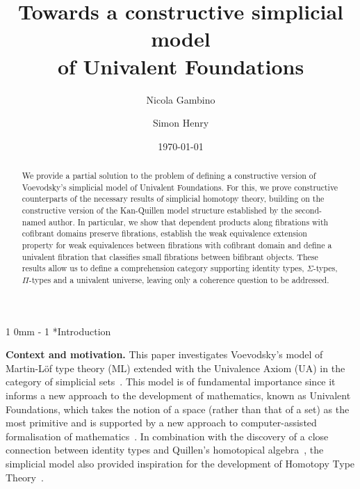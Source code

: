 \documentclass[reqno,10pt,a4paper,oneside]{amsart}
\title[]{Towards a constructive  simplicial model \\ of Univalent Foundations}
\makeatletter
\renewcommand{\section}{\@startsection
{section}%
{1}%
{0mm}%
{-\baselineskip}%
{1\baselineskip}%
{\Large \bfseries}}%
\numberwithin{equation}{section}
\theoremstyle{mythm}
\theoremstyle{mydef}
\theoremstyle{myrmk}
\makeatother
\begin{document}
\begin{abstract}
We provide a partial solution to the problem of defining a constructive version of 
Voevodsky's simplicial model of Univalent Foundations. For this, we prove constructive counterparts of the 
necessary results of simplicial homotopy theory, building on the constructive
version of the Kan-Quillen model structure established by the second-named author. In particular, 
 we show  that dependent products along fibrations with
 cofibrant domains preserve fibrations, establish the weak equivalence extension property
for weak equivalences between fibrations with cofibrant domain and define a univalent 
fibration that classifies small fibrations between bifibrant objects. 
These results allow us to define a comprehension category supporting identity types,
$\Sigma$-types, $\Pi$-types and a univalent universe, leaving only
a coherence question to be addressed.
\end{abstract}

\author{Nicola Gambino}
\address{School of Mathematics, University of Leeds, United Kingdom}


\author{Simon Henry}
\address{Department of Mathematics and Statistics, University of Ottawa, Canads}


 \date{\today}
 
 

\maketitle

\tableofcontents

\section*{Introduction} 

\textbf{Context and motivation.} This paper investigates Voevodsky's model of Martin-L\"of type theory (ML)
extended with the Univalence Axiom (UA)  in the category of simplicial sets~\cite{voevodsky-simplicial-model}.  This model is of fundamental importance since it  informs a new approach to the development of mathematics, known as Univalent Foundations, which takes the notion of a space (rather than that of a set) as the most primitive and is supported by a new approach to computer-assisted formalisation of mathematics~\cite{voevodsky:library}. In combination with the discovery of a close connection between identity types and Quillen's homotopical algebra~\cite{awodey-warren:homotopy-idtype,gambino-garner:idtypewfs}, the simplicial model also provided inspiration for the development of  Homotopy Type Theory~\cite{hottbook}.
\end{document}
